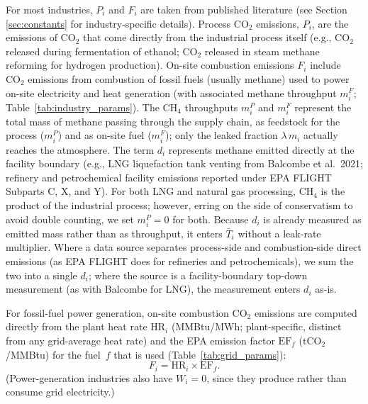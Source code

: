 \documentclass[11pt]{article}
\newcommand{\cotwo}{\ensuremath{\mathrm{CO_2}}}
\newcommand{\chfour}{\ensuremath{\mathrm{CH_4}}}
\begin{document}
\noindent
For most industries, $P_i$ and $F_i$ are taken from published literature (see Section \ref{sec:constants} for industry-specific details). Process \cotwo{} emissions, $P_i$, are the emissions of \cotwo{} that come directly from the industrial process itself (e.g., \cotwo{} released during fermentation of ethanol; \cotwo{} released in steam methane reforming for hydrogen production). On-site combustion emissions $F_i$ include \cotwo{} emissions from combustion of fossil fuels (usually methane) used to power on-site electricity and heat generation (with associated methane throughput $m_i^F$; Table~\ref{tab:industry_params}). The \chfour{} throughputs $m_i^P$ and $m_i^F$ represent the total mass of methane passing through the supply chain, as feedstock for the process ($m_i^P$) and as on-site fuel ($m_i^F$); only the leaked fraction $\lambda\,m_i$ actually reaches the atmosphere. The term $d_i$ represents methane emitted directly at the facility boundary (e.g., LNG liquefaction tank venting from Balcombe et al.\ 2021; refinery and petrochemical facility emissions reported under EPA FLIGHT Subparts C, X, and Y). For both LNG and natural gas processing, \chfour{} is the product of the industrial process; however, erring on the side of conservatism to avoid double counting, we set $m_i^P=0$ for both. Because $d_i$ is already measured as emitted mass rather than as throughput, it enters $\bar{T}_i$ without a leak-rate multiplier. Where a data source separates process-side and combustion-side direct emissions (as EPA FLIGHT does for refineries and petrochemicals), we sum the two into a single $d_i$; where the source is a facility-boundary top-down measurement (as with Balcombe for LNG), the measurement enters $d_i$ as-is.

For fossil-fuel power generation, on-site combustion \cotwo{} emissions are computed directly from the plant heat rate $\mathrm{HR}_i$ (MMBtu/MWh; plant-specific, distinct from any grid-average heat rate) and the EPA emission factor $\mathrm{EF}_f$ (t\cotwo{}/MMBtu) for the fuel~$f$ that is used (Table~\ref{tab:grid_params}):
%
\begin{equation}
  F_i = \mathrm{HR}_i \times \mathrm{EF}_f.
  \label{eq:heat_rate}
\end{equation}
%
(Power-generation industries also have $W_i = 0$, since they produce rather than consume grid electricity.)
\end{document}
